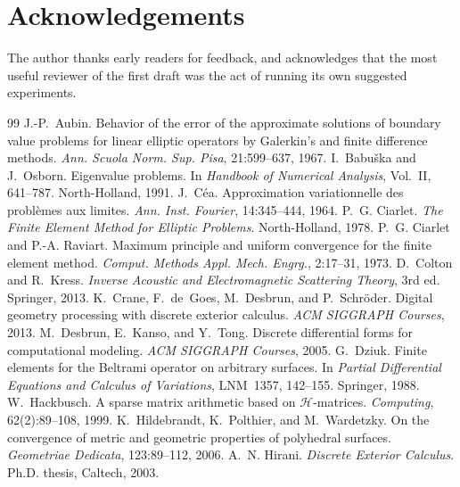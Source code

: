 \documentclass[11pt]{article}
\theoremstyle{plain}
\theoremstyle{definition}
\theoremstyle{remark}
\begin{document}
\section*{Acknowledgements}
The author thanks early readers for feedback, and acknowledges that the most
useful reviewer of the first draft was the act of running its own suggested
experiments.


\begin{thebibliography}{99}
 J.-P.~Aubin. Behavior of the error of the approximate solutions of boundary value problems for linear elliptic operators by Galerkin's and finite difference methods. \emph{Ann. Scuola Norm. Sup. Pisa}, 21:599--637, 1967.
 I.~Babuška and J.~Osborn. Eigenvalue problems. In \emph{Handbook of Numerical Analysis}, Vol.~II, 641--787. North-Holland, 1991.
 J.~Céa. Approximation variationnelle des problèmes aux limites. \emph{Ann. Inst. Fourier}, 14:345--444, 1964.
 P.~G. Ciarlet. \emph{The Finite Element Method for Elliptic Problems}. North-Holland, 1978.
 P.~G. Ciarlet and P.-A. Raviart. Maximum principle and uniform convergence for the finite element method. \emph{Comput. Methods Appl. Mech. Engrg.}, 2:17--31, 1973.
 D.~Colton and R.~Kress. \emph{Inverse Acoustic and Electromagnetic Scattering Theory}, 3rd ed. Springer, 2013.
 K.~Crane, F.~de~Goes, M.~Desbrun, and P.~Schröder. Digital geometry processing with discrete exterior calculus. \emph{ACM SIGGRAPH Courses}, 2013.
 M.~Desbrun, E.~Kanso, and Y.~Tong. Discrete differential forms for computational modeling. \emph{ACM SIGGRAPH Courses}, 2005.
 G.~Dziuk. Finite elements for the Beltrami operator on arbitrary surfaces. In \emph{Partial Differential Equations and Calculus of Variations}, LNM~1357, 142--155. Springer, 1988.
 W.~Hackbusch. A sparse matrix arithmetic based on $\mathcal{H}$-matrices. \emph{Computing}, 62(2):89--108, 1999.
 K.~Hildebrandt, K.~Polthier, and M.~Wardetzky. On the convergence of metric and geometric properties of polyhedral surfaces. \emph{Geometriae Dedicata}, 123:89--112, 2006.
 A.~N. Hirani. \emph{Discrete Exterior Calculus}. Ph.D. thesis, Caltech, 2003.

\end{thebibliography}
\end{document}

